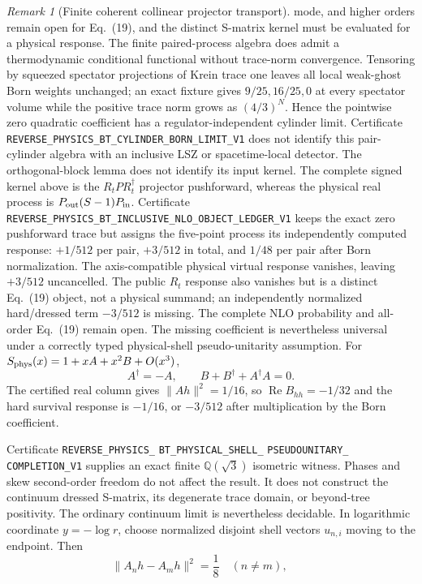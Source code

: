 \documentclass[11pt]{article}
\theoremstyle{definition}
\theoremstyle{remark}
\newtheorem{remark}[theorem]{Remark}
\begin{document}
\begin{remark}[Finite coherent collinear projector transport]
mode, and higher orders remain open for Eq.~(19), and the distinct S-matrix
kernel must be evaluated for a physical response.
The finite paired-process algebra does admit a thermodynamic conditional
functional without trace-norm convergence.  Tensoring by squeezed spectator
projections of Krein trace one leaves all local weak-ghost Born weights
unchanged; an exact fixture gives $9/25,16/25,0$ at every spectator volume
while the positive trace norm grows as $(4/3)^N$.  Hence the pointwise zero
quadratic coefficient has a regulator-independent cylinder limit.  Certificate
\texttt{REVERSE\_PHYSICS\_BT\_CYLINDER\_BORN\_LIMIT\_V1} does not identify
this pair-cylinder algebra with an inclusive LSZ or spacetime-local detector.
The orthogonal-block lemma does not identify its input kernel.  The complete
signed kernel above is the $R_tP R_t^\dagger$ projector pushforward, whereas
the physical real process is $P_{\rm out}(S-1)P_{\rm in}$.  Certificate
\texttt{REVERSE\_PHYSICS\_BT\_INCLUSIVE\_NLO\_OBJECT\_LEDGER\_V1}
keeps the exact zero pushforward trace but assigns the five-point process its
independently computed response: $+1/512$ per pair, $+3/512$ in total, and
$1/48$ per pair after Born normalization.  The axis-compatible physical
virtual response vanishes, leaving $+3/512$ uncancelled.  The public $R_t$
response also vanishes but is a distinct Eq.~(19) object, not a physical
summand; an independently normalized hard/dressed term $-3/512$ is missing.
The complete NLO probability and all-order Eq.~(19) remain open.
The missing coefficient is nevertheless universal under a correctly typed
physical-shell pseudo-unitarity assumption.  For
$S_{\rm phys}(x)=1+xA+x^2B+O(x^3)$,
\[
 A^\dagger=-A,\qquad B+B^\dagger+A^\dagger A=0.
\]
The certified real column gives $\|Ah\|^2=1/16$, so
$\operatorname{Re}B_{hh}=-1/32$ and the hard survival response is $-1/16$,
or $-3/512$ after multiplication by the Born coefficient.\par\noindent
Certificate
\texttt{REVERSE\_PHYSICS\_}
\allowbreak\texttt{BT\_PHYSICAL\_SHELL\_}
\allowbreak\texttt{PSEUDOUNITARY\_}
\allowbreak\texttt{COMPLETION\_V1} supplies an exact finite
$\mathbb Q(\sqrt3)$ isometric witness.  Phases and skew second-order freedom
do not affect the result.  It does not construct the continuum
dressed S-matrix, its degenerate trace domain, or beyond-tree positivity.
The ordinary continuum limit is nevertheless decidable.  In logarithmic
coordinate $y=-\log r$, choose normalized disjoint shell vectors $u_{n,i}$
moving to the endpoint.  Then
\[
 \|A_nh-A_mh\|^2=\frac18\quad(n\ne m),\qquad
\]
\end{remark}
\end{document}

